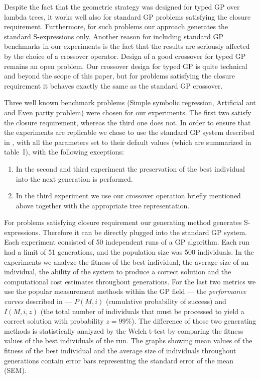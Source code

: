 \documentclass[conference]{IEEEtran}
\begin{document}
Despite the fact that the geometric strategy was designed for typed GP over lambda trees, it works well also for standard GP problems satisfying the closure requirement. Furthermore, for such problems our approach generates the standard S-expressions only. Another reason for including standard GP benchmarks in our experiments is the fact that the results are seriously affected by the choice of a crossover 
operator. Design of a good crossover for typed GP remains an open problem. Our crossover design for typed GP is quite technical and beyond the scope of this paper, but for problems satisfying the closure requirement it behaves exactly the same as the standard GP crossover. 

Three well known benchmark problems
(Simple symbolic regression, Artificial ant and
Even parity problem) were chosen for our experiments.
The first two satisfy the closure requirement, 
whereas the third one does not.
In order to ensure that the experiments are replicable we chose to use the standard GP system described in \cite{koza92}, with all the parameters set to their default values (which are summarized in table~I), with the following exceptions:

\begin{enumerate}
  \item In the second and third experiment the preservation of the best individual into the next generation is performed.
  \item In the third experiment we use our crossover operation briefly mentioned above together with the appropriate tree representation.
\end{enumerate}

For problems satisfying closure requirement our generating method generates S-expressions. Therefore it can be directly plugged into the standard GP system.
Each experiment consisted of 50 independent runs 
of a GP algorithm. Each run had a limit of 51 generations, and the population size
was 500 individuals.
In the experiments we analyze the fitness of the best individual,
the average size of an individual,
the ability of the system to produce a correct solution 
and the computational cost estimates throughout generations. 
For the last two metrics we use the popular measurement  
methods within the GP field --- the \textit{performance curves}
described in \cite{koza92} --- $P(M,i)$ (cumulative probability of success) 
and $I(M,i,z)$ (the total number of individuals that must be processed 
to yield a correct solution with probability $z =99\%$).
The difference of those two generating methods 
is statistically analyzed by the Welch t-test
by comparing the fitness values of the best individuals of the run. 
The graphs showing mean values of the fitness of the best individual and
the average size of individuals throughout generations
contain error bars representing the standard error of the mean (SEM).
\end{document}
